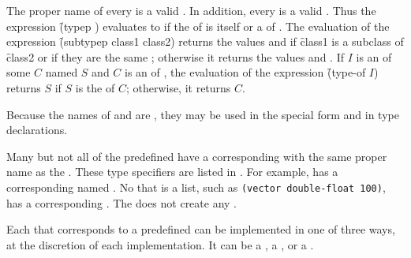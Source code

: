 The proper name of every  is a valid .  In
addition, every   is a valid .  
Thus the expression \f{(typep  )} evaluates to 
 if the  of  is  itself or 
a  of .  The evaluation of the expression
\f{(subtypep class1 class2)} returns the values 
 and  if \f{class1} is a subclass of \f{class2} or if they are the
same ; otherwise it returns the values 
 and .
If  $I$ is an  of some  $C$ named $S$ 
and $C$ is an  of , 
the evaluation of the expression \f{(type-of $I$\/)} returns $S$ 
if $S$ is the  of $C$; 
otherwise, it returns $C$.

Because the names of  
and   are , they may
be used in the special form  and in type declarations.
                                   
Many but not all of the predefined  have a
corresponding  with 
the same proper name as the .  These type
specifiers are listed in \figref\ClassTypeCorrespondence.
For example,  has 
a corresponding  named .  
No  that is a
list, such as {\tt (vector double-float 100)}, has a corresponding .
The   does not create any .
                                            
Each  that corresponds to a predefined  can
be implemented in one of three ways, at the discretion of each implementation.
It can be a ,
a ,
or a .


